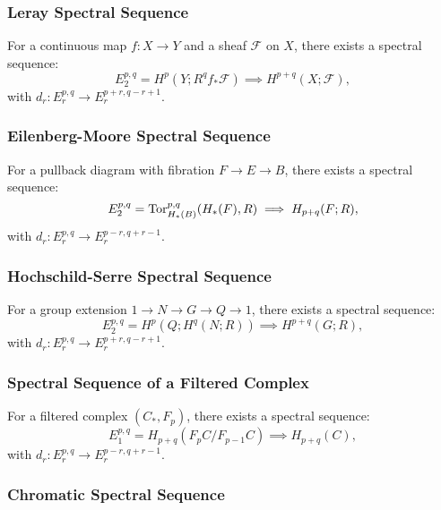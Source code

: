 \documentclass{article}
\begin{document}
\subsubsection{Leray Spectral Sequence}

\begin{theorem}
For a continuous map \( f: X \to Y \) and a sheaf \( \mathcal{F} \) on \( X \), there exists a spectral sequence:
\[
E_2^{p,q} = H^p(Y; R^q f_* \mathcal{F}) \implies H^{p+q}(X; \mathcal{F}),
\]
with \( d_r: E_r^{p,q} \to E_r^{p+r, q-r+1} \).
\end{theorem}

\subsubsection{Eilenberg-Moore Spectral Sequence}

\begin{theorem}
For a pullback diagram with fibration \( F \to E \to B \), there exists a spectral sequence:
\[
E_2^{p,q} = \text{Tor}_{H_*(B)}^{p,q}(H_*(F), R) \implies H_{p+q}(F; R),
\]
with \( d_r: E_r^{p,q} \to E_r^{p-r, q+r-1} \).
\end{theorem}

\subsubsection{Hochschild-Serre Spectral Sequence}

\begin{theorem}
For a group extension \( 1 \to N \to G \to Q \to 1 \), there exists a spectral sequence:
\[
E_2^{p,q} = H^p(Q; H^q(N; R)) \implies H^{p+q}(G; R),
\]
with \( d_r: E_r^{p,q} \to E_r^{p+r, q-r+1} \).
\end{theorem}

\subsubsection{Spectral Sequence of a Filtered Complex}

\begin{theorem}
For a filtered complex \( (C_*, F_p) \), there exists a spectral sequence:
\[
E_1^{p,q} = H_{p+q}(F_p C / F_{p-1} C) \implies H_{p+q}(C),
\]
with \( d_r: E_r^{p,q} \to E_r^{p-r, q+r-1} \).
\end{theorem}

\subsubsection{Chromatic Spectral Sequence}
\end{document}

